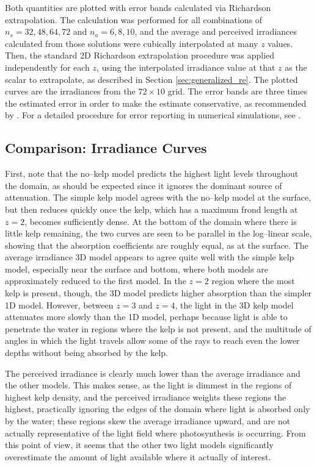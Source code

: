 Both quantities are plotted with error bands calculated via Richardson extrapolation.
The calculation was performed for all combinations of $n_s=32,48,64,72$ and $n_a=6,8,10$, and the average and perceived irradiances calculated from those solutions were cubically interpolated at many $z$ values.
Then, the standard 2D Richardson extrapolation procedure was applied independently for each $z$, using the interpolated irradiance value at that $z$ as the scalar to extrapolate, as described in Section \ref{sec:generalized_re}.
The plotted curves are the irradiances from the $72\times 10$ grid.
The error bands are three times the estimated error in order to make the estimate conservative, as recommended by \cite{roache_perspective:_1994}.
For a detailed procedure for error reporting in numerical simulations, see \cite{noauthor_procedure_2008}.

\subsection{Comparison: Irradiance Curves}
First, note that the no--kelp model predicts the highest light levels throughout the domain, as should be expected since it ignores the dominant source of attenuation.
The simple kelp model agrees with the no--kelp model at the surface, but then reduces quickly once the kelp, which has a maximum frond length at $z=2$, becomes sufficiently dense.
At the bottom of the domain where there is little kelp remaining, the two curves are seen to be parallel in the log--linear scale, showing that the absorption coefficients are roughly equal, as at the surface.
The average irradiance 3D model appears to agree quite well with the simple kelp model, especially near the surface and bottom, where both models are approximately reduced to the first model.
In the $z=2$ region where the most kelp is present, though, the 3D model predicts higher absorption than the simpler 1D model.
However, between $z=3$ and $z=4$, the light in the 3D kelp model attenuates more slowly than the 1D model, perhaps because light is able to penetrate the water in regions where the kelp is not present, and the multitude of angles in which the light travels allow some of the rays to reach even the lower depths without being absorbed by the kelp.

The perceived irradiance is clearly much lower than the average irradiance and the other models.
This makes sense, as the light is dimmest in the regions of highest kelp density, and the perceived irradiance weights these regions the highest, practically ignoring the edges of the domain where light is absorbed only by the water; these regions skew the average irradiance upward, and are not actually representative of the light field where photosynthesis is occurring.
From this point of view, it seems that the other two light models significantly overestimate the amount of light available where it actually of interest.

